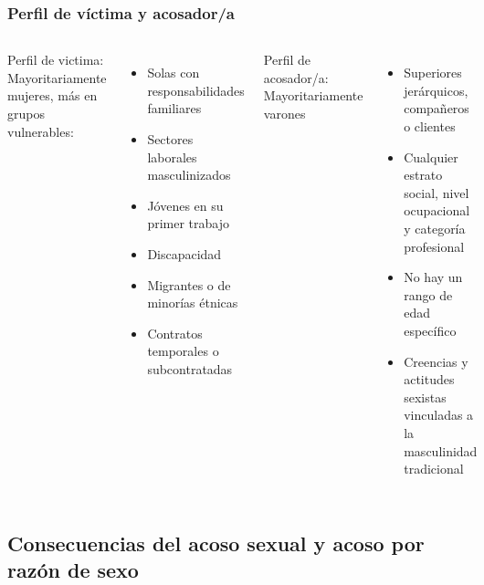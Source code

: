 \documentclass{beamer}
\newcommand{\highlight}[1]{{\color{Blue} #1}}
\begin{document}
    \begin{frame}
        \frametitle{Perfil de víctima y acosador/a}
        \begin{columns}
            \highlight{Perfil de victima}: Mayoritariamente mujeres, más en grupos vulnerables:
            \begin{itemize}
                \item Solas con responsabilidades familiares
                \item Sectores laborales masculinizados
                \item Jóvenes en su primer trabajo
                \item Discapacidad
                \item Migrantes o de minorías étnicas
                \item Contratos temporales o subcontratadas
            \end{itemize}
            \highlight{Perfil de acosador/a}: Mayoritariamente varones
            \begin{itemize}
                \item Superiores jerárquicos, compañeros o clientes
                \item Cualquier estrato social, nivel ocupacional y categoría profesional
                \item No hay un rango de edad específico
                \item Creencias y actitudes sexistas vinculadas a la masculinidad tradicional
            \end{itemize}
        \end{columns}
    \end{frame}

    \subsection{Consecuencias del acoso sexual y acoso por razón de sexo}
\end{document}
